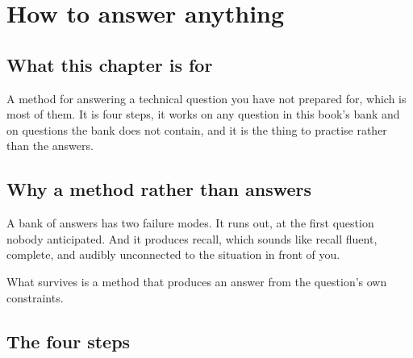 \chapter{How to answer anything}
\label{ch:answering}

\section*{What this chapter is for}

A method for answering a technical question you have not prepared for, which is
most of them. It is four steps, it works on any question in this book's bank
and on questions the bank does not contain, and it is the thing to practise
rather than the answers.

\section{Why a method rather than answers}

A bank of answers has two failure modes. It runs out, at the first question
nobody anticipated. And it produces recall, which sounds like recall \dash{}
fluent, complete, and audibly unconnected to the situation in front of you.


What survives is a method that produces an answer from the question's own
constraints.

\section{The four steps}

